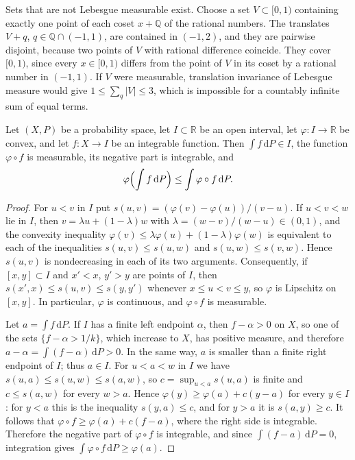 Sets that are not Lebesgue measurable exist. Choose a set $V\subset[0,1)$ containing exactly one point of each coset $x+\mathbb Q$ of the rational numbers. The translates $V+q$, $q\in\mathbb Q\cap(-1,1)$, are contained in $(-1,2)$, and they are pairwise disjoint, because two points of $V$ with rational difference coincide. They cover $[0,1)$, since every $x\in[0,1)$ differs from the point of $V$ in its coset by a rational number in $(-1,1)$. If $V$ were measurable, translation invariance of Lebesgue measure would give $1\leq\sum_q|V|\leq3$, which is impossible for a countably infinite sum of equal terms.

\begin{lemma}\label{lem:jensen}
Let $(X,P)$ be a probability space, let $I\subset\mathbb R$ be an open interval, let $\varphi\colon I\to\mathbb R$ be convex, and let $f\colon X\to I$ be an integrable function. Then $\int f\,\mathrm dP\in I$, the function $\varphi\circ f$ is measurable, its negative part is integrable, and
\[
 \varphi\Bigl(\int f\,\mathrm dP\Bigr)\leq\int\varphi\circ f\,\mathrm dP.
\]
\end{lemma}
\begin{proof}
For $u<v$ in $I$ put $s(u,v)=(\varphi(v)-\varphi(u))/(v-u)$. If $u<v<w$ lie in $I$, then $v=\lambda u+(1-\lambda)w$ with $\lambda=(w-v)/(w-u)\in(0,1)$, and the convexity inequality $\varphi(v)\leq\lambda\varphi(u)+(1-\lambda)\varphi(w)$ is equivalent to each of the inequalities $s(u,v)\leq s(u,w)$ and $s(u,w)\leq s(v,w)$. Hence $s(u,v)$ is nondecreasing in each of its two arguments. Consequently, if $[x,y]\subset I$ and $x'<x$, $y'>y$ are points of $I$, then $s(x',x)\leq s(u,v)\leq s(y,y')$ whenever $x\leq u<v\leq y$, so $\varphi$ is Lipschitz on $[x,y]$. In particular, $\varphi$ is continuous, and $\varphi\circ f$ is measurable.

Let $a=\int f\,\mathrm dP$. If $I$ has a finite left endpoint $\alpha$, then $f-\alpha>0$ on $X$, so one of the sets $\{f-\alpha>1/k\}$, which increase to $X$, has positive measure, and therefore $a-\alpha=\int(f-\alpha)\,\mathrm dP>0$. In the same way, $a$ is smaller than a finite right endpoint of $I$; thus $a\in I$. For $u<a<w$ in $I$ we have $s(u,a)\leq s(u,w)\leq s(a,w)$, so $c=\sup_{u<a}s(u,a)$ is finite and $c\leq s(a,w)$ for every $w>a$. Hence $\varphi(y)\geq\varphi(a)+c(y-a)$ for every $y\in I$: for $y<a$ this is the inequality $s(y,a)\leq c$, and for $y>a$ it is $s(a,y)\geq c$. It follows that $\varphi\circ f\geq\varphi(a)+c(f-a)$, where the right side is integrable. Therefore the negative part of $\varphi\circ f$ is integrable, and since $\int(f-a)\,\mathrm dP=0$, integration gives $\int\varphi\circ f\,\mathrm dP\geq\varphi(a)$.
\end{proof}

